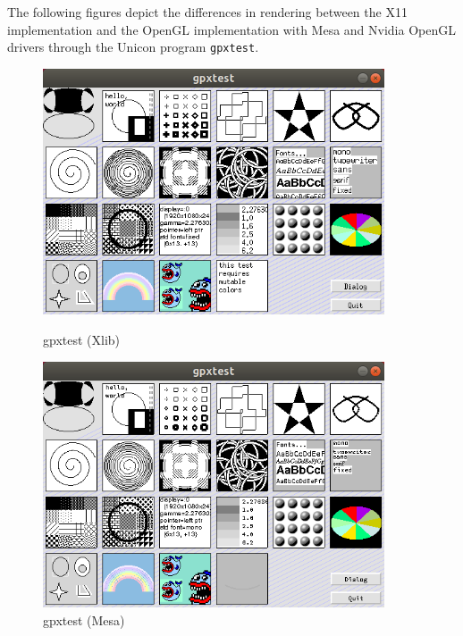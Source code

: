 \documentclass[letterpaper,12pt]{article}
\begin{document}
The following figures depict the differences in rendering between the X11
implementation and the OpenGL implementation with Mesa and Nvidia OpenGL 
drivers through the Unicon program \texttt{gpxtest}.

\begin{figure}[h!]
  \centering
  \begin{minipage}{0.33\textwidth}
    \centering
    \includegraphics[width=0.9\textwidth]{gpxtest-x11.png}
    \caption{gpxtest (Xlib)}
  \end{minipage}\hfill
  \begin{minipage}{0.33\textwidth}
    \centering
    \includegraphics[width=0.9\textwidth]{gpxtest-ogl.png}
    \caption{gpxtest (Mesa)}
  \end{minipage}\hfill
  \begin{minipage}{0.33\textwidth}
    \centering

\end{minipage}
\end{figure}
\end{document}

